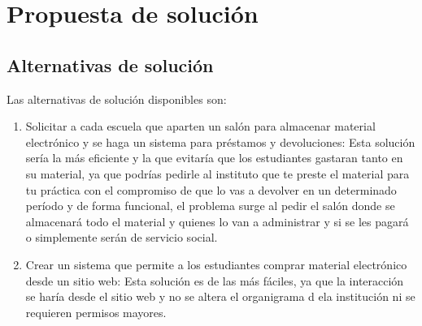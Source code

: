 \section{Propuesta de solución}

\subsection{Alternativas de solución}

Las alternativas de solución disponibles son:

\begin{enumerate}
	\item Solicitar a cada escuela que aparten un salón para almacenar material electrónico y se haga un sistema para préstamos y devoluciones: Esta solución sería la más eficiente y la que evitaría que los estudiantes gastaran tanto en su material, ya que podrías pedirle al instituto que te preste el material para tu práctica con el compromiso de que lo vas a devolver en un determinado período y de forma funcional, el problema surge al pedir el salón donde se almacenará todo el material y quienes lo van a administrar y si se les pagará o simplemente serán de servicio social.
	\item Crear un sistema que permite a los estudiantes comprar material electrónico desde un sitio web: Esta solución es de las más fáciles, ya que la interacción se haría desde el sitio web y no se altera el organigrama d ela institución ni se requieren permisos mayores.
\end{enumerate}
